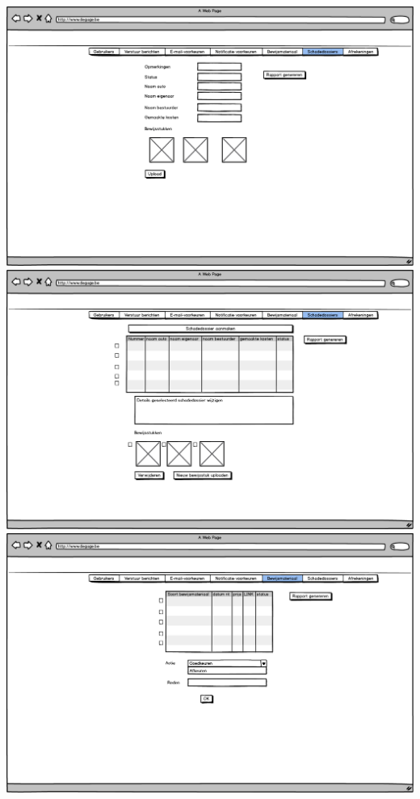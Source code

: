 \documentclass[]{article}
\begin{document}
\includegraphics[scale=0.4]{mockups/admin_schadedossiermaken.png}
\includegraphics[scale=0.4]{mockups/admin_schadedossiers.png}
\includegraphics[scale=0.4]{mockups/admin_verifierenbewijsmateriaal.png}
\end{document}
